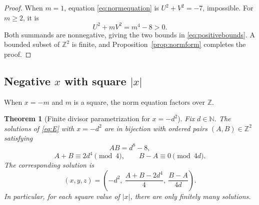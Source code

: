 \documentclass[11pt,a4paper]{amsart}
\numberwithin{equation}{section}
\newtheorem{theorem}{Theorem}[section]
\theoremstyle{definition}
\newcommand{\Z}{\mathbb Z}
\newcommand{\N}{\mathbb N}
\begin{document}
\begin{proof}
When \(m=1\), equation \eqref{eq:normequation} is
\(U^2+V^2=-7\), impossible.  For \(m\ge2\), it is
\begin{equation*}
 U^2+mV^2=m^4-8>0.
\end{equation*}
Both summands are nonnegative, giving the two bounds in
\eqref{eq:positivebounds}.  A bounded subset of \(\Z^2\) is finite,
and Proposition~\ref{prop:normform} completes the proof.
\end{proof}

\subsection{Negative \texorpdfstring{\(x\)}{x} with square \texorpdfstring{\(|x|\)}{|x|}}

When \(x=-m\) and \(m\) is a square, the norm equation factors over
\(\Z\).

\begin{theorem}[Finite divisor parametrization for \(x=-d^2\)]
\label{thm:squarem}
Fix \(d\in\N\).  The solutions of \eqref{eq:E} with \(x=-d^2\) are
in bijection with ordered pairs \((A,B)\in\Z^2\) satisfying
\begin{equation}
 AB=d^8-8,
 \label{eq:ABproduct}
\end{equation}
\begin{equation}
 A+B\equiv2d^4\pmod4,
 \qquad
 B-A\equiv0\pmod{4d}.
 \label{eq:ABcongruences}
\end{equation}
The corresponding solution is
\begin{equation}
 (x,y,z)=
 \left(-d^2,\ \frac{A+B-2d^4}{4},\ \frac{B-A}{4d}\right).
 \label{eq:ABsolution}
\end{equation}
In particular, for each square value of \(|x|\), there are only
finitely many solutions.
\end{theorem}
\end{document}

